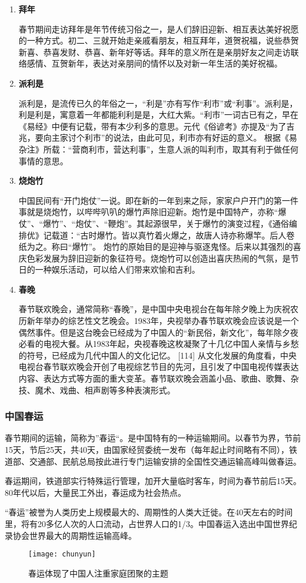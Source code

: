 \begin{enumerate}
\item \textbf{拜年}

春节期间走访拜年是年节传统习俗之一，是人们辞旧迎新、相互表达美好祝愿的一种方式。初二、三就开始走亲戚看朋友，相互拜年，道贺祝福，说些恭贺新喜、恭喜发财、恭喜、新年好等话。拜年的意义所在是亲朋好友之间走访联络感情、互贺新年，表达对亲朋间的情怀以及对新一年生活的美好祝福。

\item \textbf{派利是}

派利是，是流传已久的年俗之一，“利是”亦有写作“利市”或“利事”。派利是，利是利是，寓意着一年都能利利是是，大红大紫。“利市”一词古已有之，早在《易经》中便有记载，带有本少利多的意思。元代《俗谚考》亦提及“为了吉兆，要向主家讨个利市”的说法，由此可见，利市亦有好运的意义。 根据《易杂注》所载：“营商利市，营达利事”，生意人派的叫利市，取其有利于做任何事情的意思。

\item \textbf{烧炮竹}

中国民间有“开门炮仗”一说。即在新的一年到来之际，家家户户开门的第一件事就是烧炮竹，以哔哔叭叭的爆竹声除旧迎新。炮竹是中国特产，亦称“爆仗”、“爆竹”、“炮仗”、“鞭炮”。其起源很早，关于爆竹的演变过程，《通俗编排优》记载道：“古时爆竹。皆以真竹着火爆之，故唐人诗亦称爆竿。后人卷纸为之。称曰“爆竹”。
炮竹的原始目的是迎神与驱逐鬼怪。后来以其强烈的喜庆色彩发展为辞旧迎新的象征符号。烧炮竹可以创造出喜庆热闹的气氛，是节日的一种娱乐活动，可以给人们带来欢愉和吉利。

\item \textbf{春晚}

春节联欢晚会，通常简称“春晚”，是中国中央电视台在每年除夕晚上为庆祝农历新年举办的综艺性文艺晚会。1983年，央视举办春节联欢晚会应该说是一个偶然事件。但是这台晚会已经成为了中国人的“新民俗，新文化”，每年除夕夜必看的电视大餐。从1983年起，央视春晚这枚凝聚了十几亿中国人亲情与乡愁的符号，已经成为几代中国人的文化记忆。 [114] 
从文化发展的角度看，中央电视台春节联欢晚会开创了电视综艺节目的先河，且引发了中国电视传媒表达内容、表达方式等方面的重大变革。春节联欢晚会涵盖小品、歌曲、歌舞、杂技、魔术、戏曲、相声剧等多种表演形式。

\end{enumerate}

\subsubsection{中国春运}
\par
春节期间的运输，简称为”春运“。是中国特有的一种运输期间。以春节为界，节前15天，节后25天，共40天，由国家经贸委统一发布（每年起止时间略有不同），铁道部、交通部、民航总局按此进行专门运输安排的全国性交通运输高峰叫做春运。
\par
春运期间，铁道部实行特殊运行管理，加开大量临时客车，时间为春节前后15天。80年代以后，大量民工外出，春运成为社会热点。
\par
“春运”被誉为人类历史上规模最大的、周期性的人类大迁徙。在40天左右的时间里，将有20多亿人次的人口流动，占世界人口的1/3。中国春运入选出中国世界纪录协会世界最大的周期性运输高峰。
\begin{figure}
    \centering
    \texttt{[image: chunyun]}
    \caption{春运体现了中国人注重家庭团聚的主题}
\end{figure}

